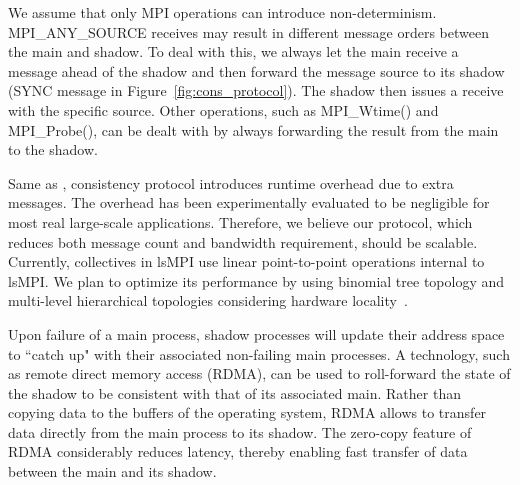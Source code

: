 We assume that only MPI operations can introduce non-determinism. MPI\_ANY\_SOURCE receives may result in different message orders between the main and shadow. To deal with this, we always let the main receive a message ahead of the shadow and then forward the message source to its shadow (SYNC message in Figure~\ref{fig:cons_protocol}). The shadow then issues a receive with the specific source. Other operations, such as MPI\_Wtime() and MPI\_Probe(), can be dealt with by always forwarding the result from the main to the shadow.

Same as \cite{engelmann2011redundant,ferreira_hpc_2011}, consistency protocol introduces runtime overhead due to extra messages. The overhead has been experimentally evaluated to be negligible for most real large-scale applications. Therefore, we believe our protocol, which reduces both message count and bandwidth requirement, should be scalable. Currently, collectives in lsMPI use linear point-to-point operations internal to lsMPI. We plan to optimize its performance by using binomial tree topology and multi-level hierarchical topologies considering hardware locality~\cite{herault2015practical}.



Upon failure of a main process, shadow processes will update their address space to ``catch up" with their associated non-failing main processes. A technology, such as remote direct memory access (RDMA), can be used to roll-forward the state of the shadow to be consistent with that of its associated main. Rather than copying data to the buffers of the operating system, RDMA allows to transfer data directly from the main process to its shadow. The zero-copy feature of RDMA considerably reduces latency, thereby enabling fast transfer of data between the main and its shadow.

 


